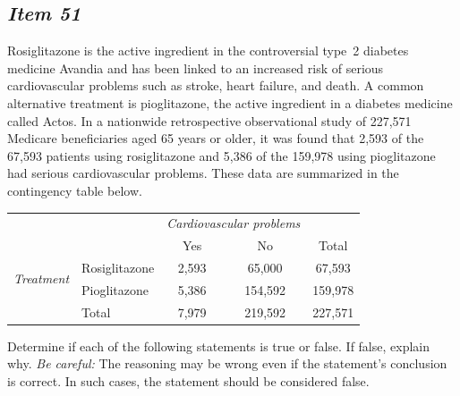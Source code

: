 \subsection{\textbf{\textit{Item 51}}}








Rosiglitazone is the active ingredient in the controversial type~2 diabetes medicine Avandia and has been linked to an increased risk of serious cardiovascular problems such as stroke, heart failure, and death. A common alternative treatment is pioglitazone, the active ingredient in a diabetes medicine called Actos. In a nationwide retrospective observational study of 227,571 Medicare beneficiaries aged 65 years or older, it was found that 2,593 of the 67,593 patients using rosiglitazone and 5,386 of the 159,978 using pioglitazone had serious cardiovascular problems. These data are summarized in the contingency table below. 


\begin{center}


\begin{tabular}{ll cc c} 


& & \multicolumn{2}{c}{\textit{Cardiovascular problems}} \\


\cline{3-4} 


& & Yes & No & Total \\


\cline{2-5}


\multirow{2}{*}{\textit{Treatment}} & Rosiglitazone & 2,593 & 65,000 & 67,593 \\


& Pioglitazone & 5,386 & 154,592 & 159,978\\


\cline{2-5}


&Total & 7,979 & 219,592 & 227,571


\end{tabular}


\end{center}


Determine if each of the following statements is true or false. If false, explain why. \textit{Be careful:} The reasoning may be wrong even if the statement's conclusion is correct. In such cases, the statement should be considered false.



